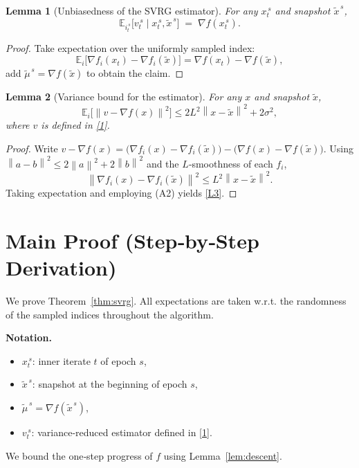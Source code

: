\documentclass{article}
\newtheorem{lemma}{Lemma}
\newcommand{\E}{\mathbb{E}}
\newcommand{\norm}[1]{\left\|#1\right\|}
\newcommand{\grad}{\nabla}
\begin{document}
\begin{lemma}[Unbiasedness of the SVRG estimator]\label{lem:unbiased}
For any $x_t^{\,s}$ and snapshot $\tilde{x}^{\,s}$,
\[
\E_{i_t^{\,s}}\!\bigl[v_t^{\,s}\mid x_t^{\,s},\tilde{x}^{\,s}\bigr]
\;=\;
\grad f(x_t^{\,s}).
\tag{L2}
\]
\end{lemma}
\begin{proof}
Take expectation over the uniformly sampled index:
\[
\E_{i}\!\bigl[\grad f_i(x_t)-\grad f_i(\tilde{x})\bigr]
=\grad f(x_t)-\grad f(\tilde{x}),
\]
add $\tilde\mu^{\,s}=\grad f(\tilde{x})$ to obtain the claim.\hfill\qedsymbol
\end{proof}

\begin{lemma}[Variance bound for the estimator]\label{lem:variance}
For any $x$ and snapshot $\tilde{x}$,
\[
\E_{i}\!\bigl[\norm{v-\grad f(x)}^{2}\bigr]
\le 2L^{2}\norm{x-\tilde{x}}^{2}+2\sigma^{2},
\tag{L3}
\]
where $v$ is defined in \eqref{1}.
\end{lemma}
\begin{proof}
Write $v-\grad f(x)=\bigl(\grad f_i(x)-\grad f_i(\tilde{x})\bigr)-\bigl(\grad f(x)-\grad f(\tilde{x})\bigr)$.  
Using $\norm{a-b}^{2}\le2\norm{a}^{2}+2\norm{b}^{2}$ and the $L$‑smoothness of each $f_i$,
\[
\norm{\grad f_i(x)-\grad f_i(\tilde{x})}^{2}\le L^{2}\norm{x-\tilde{x}}^{2}.
\]
Taking expectation and employing (A2) yields \eqref{L3}.\hfill\qedsymbol
\end{proof}

\section*{Main Proof (Step‑by‑Step Derivation)}
We prove Theorem~\ref{thm:svrg}.  
All expectations are taken w.r.t. the randomness of the sampled indices throughout the algorithm.

\noindent\textbf{Notation.}
\begin{itemize}
\item $x_t^{\,s}$: inner iterate $t$ of epoch $s$,
\item $\tilde{x}^{\,s}$: snapshot at the beginning of epoch $s$,
\item $\tilde{\mu}^{\,s}=\grad f(\tilde{x}^{\,s})$,
\item $v_t^{\,s}$: variance‑reduced estimator defined in \eqref{1}.
\end{itemize}

We bound the one‑step progress of $f$ using Lemma~\ref{lem:descent}.
\end{document}

